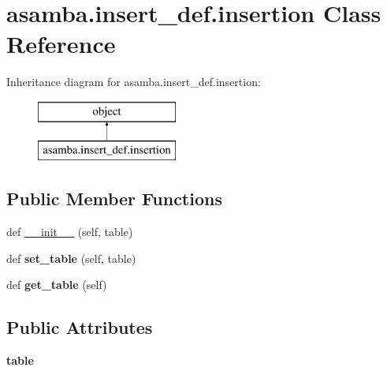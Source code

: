 \hypertarget{classasamba_1_1insert__def_1_1insertion}{}\section{asamba.\+insert\+\_\+def.\+insertion Class Reference}
\label{classasamba_1_1insert__def_1_1insertion}
Inheritance diagram for asamba.\+insert\+\_\+def.\+insertion\+:\begin{figure}[H]
\begin{center}
\leavevmode
\includegraphics[height=2.000000cm]{classasamba_1_1insert__def_1_1insertion}
\end{center}
\end{figure}
\subsection*{Public Member Functions}
\begin{DoxyCompactItemize}
\item 
def \hyperlink{classasamba_1_1insert__def_1_1insertion_a0e4e59d72941182ec69091fc07d6cef0}{\+\_\+\+\_\+init\+\_\+\+\_\+} (self, table)
\item 
\mbox{\label{classasamba_1_1insert__def_1_1insertion_a5b4f042cbf109ed685775bedce7b98b6}} 
def {\bfseries set\+\_\+table} (self, table)
\item 
\mbox{\label{classasamba_1_1insert__def_1_1insertion_aeba8c7a346ddc819949ff194af0b4690}} 
def {\bfseries get\+\_\+table} (self)
\end{DoxyCompactItemize}
\subsection*{Public Attributes}
\begin{DoxyCompactItemize}
\item 
\mbox{\label{classasamba_1_1insert__def_1_1insertion_a47a62132fc8d77aee73fa5d08dbf6ce2}} 
{\bfseries table}
\end{DoxyCompactItemize}


